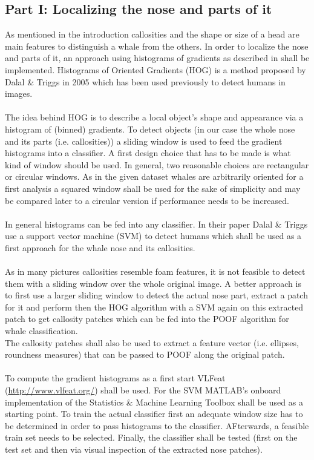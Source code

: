 \documentclass[11pt,a4paper,oneside]{report}
\begin{document}
\subsection*{Part I: Localizing the nose and parts of it}
As mentioned in the introduction callosities and the shape or size of a head are main features to distinguish a whale from the others. In order to localize the nose and parts of it, an approach using histograms of gradients as described in \citep{dalal2005histograms}
shall be implemented. Histograms of Oriented Gradients (HOG) is a method proposed by Dalal \& Triggs in 2005 which has been used previously to detect humans in images. 
\\
\\
The idea behind HOG is to describe a local object's shape and appearance via a histogram of (binned) gradients. To detect objects (in our case the whole nose and its parts (i.e. callosities)) a sliding window is used to feed the gradient histograms into a classifier. A first design choice that has to be made is what kind of window should be used. In general, two reasonable choices are rectangular or circular windows. As in the given dataset whales are arbitrarily oriented for a first analysis a squared window shall be used for the sake of simplicity and may be compared later to a circular version if performance needs to be increased.
\\
\\
In general histograms can be fed into any classifier. In their paper Dalal \& Triggs use a support vector machine (SVM) to detect humans which shall be used as a first approach for the whale nose and its callosities.
\\
\\
As in many pictures callosities resemble foam features, it is not feasible to detect them with a sliding window over the whole original image. A better approach is to first use a larger sliding window to detect the actual nose part, extract a patch for it and perform then the HOG algorithm with a SVM again on this extracted patch to get callosity patches which can be fed into the POOF algorithm for whale classification.
\\
The callosity patches shall also be used to extract a feature vector (i.e. ellipses, roundness measures) that can be passed to POOF along the original patch.
\\
\\
To compute the gradient histograms as a first start VLFeat (\url{http://www.vlfeat.org/}) shall be used. For the SVM MATLAB's onboard implementation of the Statistics \& Machine Learning Toolbox shall be used as a starting point. To train the actual classifier first an adequate window size has to be determined in order to pass histograms to the classifier. AFterwards, a feasible train set needs to be selected. Finally, the classifier shall be tested (first on the test set and then via visual inspection of the extracted nose patches). 
\end{document}
